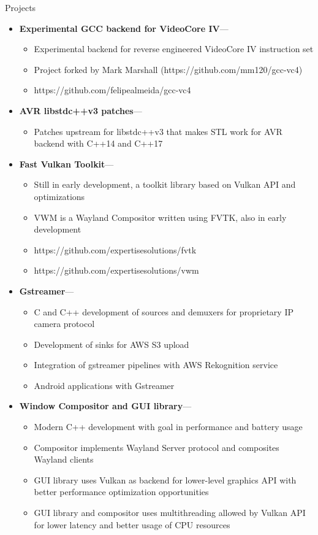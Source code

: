\documentclass[10pt,oneside]{article}
\newenvironment{ressection}[1]{
	\vspace{4pt}
	{\fontfamily{phv}\selectfont\Large#1}
	\begin{itemize}
	\vspace{3pt}
}{
	\end{itemize}
}
\newcommand{\ressubitem}[1]{
	\vspace{-1pt}
	\item \begin{flushleft} #1 \end{flushleft}
}
\newcommand{\resonelinebigitem}[2]{
	\vspace{-5pt}
	\item
	\textbf{#1}---#2
}
\newenvironment{resonelinesubsec}[2]{
	\resonelinebigitem{#1}{#2}
	\vspace{-2pt}
	\begin{itemize}
}{
	\end{itemize}
}
\begin{document}
\newpage
\begin{ressection}{Projects}

  \begin{resonelinesubsec}{Experimental GCC backend for VideoCore IV}{}
    \ressubitem{Experimental backend for reverse engineered VideoCore
      IV instruction set}
    \ressubitem{Project forked by Mark Marshall (https://github.com/mm120/gcc-vc4)}
    \ressubitem{https://github.com/felipealmeida/gcc-vc4}
  \end{resonelinesubsec}

  \begin{resonelinesubsec}{AVR libstdc++v3 patches}{}
    \ressubitem{Patches upstream for libstdc++v3 that makes STL work
      for AVR backend with C++14 and C++17}
  \end{resonelinesubsec}
  
  \begin{resonelinesubsec}{Fast Vulkan Toolkit}{}
    \ressubitem{Still in early development, a toolkit library based on
      Vulkan API and optimizations}
    \ressubitem{VWM is a Wayland Compositor written using FVTK, also
      in early development}
    \ressubitem{https://github.com/expertisesolutions/fvtk}
    \ressubitem{https://github.com/expertisesolutions/vwm}
  \end{resonelinesubsec}
  
  \begin{resonelinesubsec}{Gstreamer}{}
    \ressubitem{C and C++ development of sources and demuxers for
      proprietary IP camera protocol}
    \ressubitem{Development of sinks for AWS S3 upload}
    \ressubitem{Integration of gstreamer pipelines with AWS
      Rekognition service}
    \ressubitem{Android applications with Gstreamer}
  \end{resonelinesubsec}

  \begin{resonelinesubsec}{Window Compositor and GUI library}{}
    \ressubitem{Modern C++ development with goal in performance and
      battery usage}
    \ressubitem{Compositor implements Wayland Server protocol and
      composites Wayland clients}
    \ressubitem{GUI library uses Vulkan as backend for lower-level
      graphics API with better performance optimization opportunities}
    \ressubitem{GUI library and compositor uses multithreading allowed
      by Vulkan API for lower latency and better usage of CPU resources}
  \end{resonelinesubsec}
  

\end{ressection}
\end{document}
